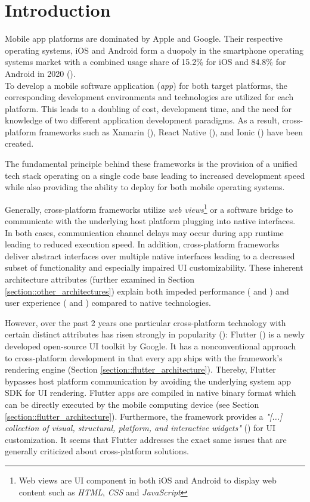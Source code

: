 \chapter{Introduction}
\label{section:introduction}
Mobile app platforms are dominated by Apple and Google. Their respective operating systems, iOS and Android form a duopoly in the smartphone operating systems market with a combined usage share of 
15.2\% for iOS and 84.8\% for Android in 2020 (\cite{IDC2021}).
\\To develop a mobile software application (\textit{app}) for both target platforms, the corresponding development environments and technologies 
are utilized for each platform. This leads to a doubling of cost, development time, and 
the need for knowledge of two different application development paradigms. 
As a result, cross-platform frameworks such as Xamarin (\cite{Xamarin2021}), React Native (\cite{Facebook2021}), and Ionic (\cite{Ionic2021}) have been created. 

The fundamental principle behind these frameworks is the provision of a unified tech stack operating on a single code base leading to increased development speed
while also providing the ability to deploy for both mobile operating systems.

Generally, cross-platform frameworks utilize \textit{web views}\footnote{Web views are UI component in both iOS and Android to display web content such as \textit{HTML}, \textit{CSS} and \textit{JavaScript}} or a software bridge to communicate with the underlying host platform plugging into 
native interfaces. In both cases, communication channel delays may occur during app runtime leading to reduced execution speed. In addition, 
cross-platform frameworks deliver abstract interfaces over multiple native interfaces leading to a decreased subset of functionality
and especially impaired UI customizability. These inherent architecture attributes (further examined in Section \ref{section::other_architectures}) explain
both impeded performance (\cite{Ebone2018} and \cite{Corbalan2019}) and user experience (\cite{Mercado2016} and \cite{Angulo2014}) compared to native technologies.

However, over the past 2 years one particular cross-platform technology with certain distinct attributes has risen strongly in popularity (\cite{Statista2021}):
Flutter (\cite{FlutterDev20}) is a newly developed open-source UI toolkit by Google. 
It has a nonconventional approach to cross-platform development in that every app ships with the framework's rendering engine (Section \ref{section::flutter_architecture}). 
Thereby, Flutter bypasses host platform communication by avoiding the underlying system app SDK for UI rendering.
Flutter apps are compiled in native binary format which can be directly executed by the mobile computing device (see Section \ref{section::flutter_architecture}).
Furthermore, the framework provides a \textit{"[...] collection of visual, structural, platform, and interactive widgets"} (\cite[l.1]{GoogleWidgets2021}) for UI customization.
It seems that Flutter addresses the exact same issues that are generally criticized about cross-platform solutions.

